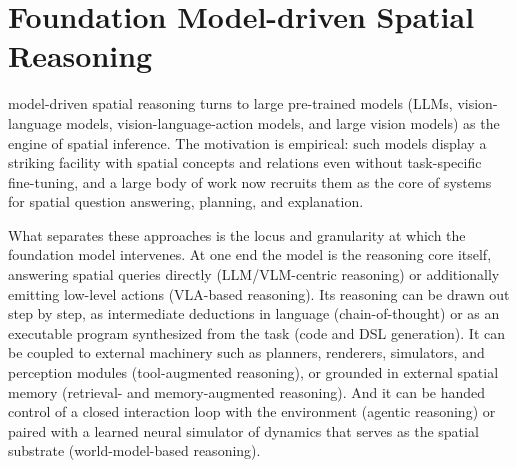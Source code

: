 

\section{Foundation Model-driven Spatial Reasoning}
\label{sec:p3_s7_3}

 model-driven spatial reasoning turns to large pre-trained models (LLMs, vision-language models, vision-language-action models, and large vision models) as the engine of spatial inference. The motivation is empirical: such models display a striking facility with spatial concepts and relations even without task-specific fine-tuning, and a large body of work now recruits them as the core of systems for spatial question answering, planning, and explanation.

What separates these approaches is the locus and granularity at which the foundation model intervenes. At one end the model is the reasoning core itself, answering spatial queries directly (LLM/VLM-centric reasoning) or additionally emitting low-level actions (VLA-based reasoning). Its reasoning can be drawn out step by step, as intermediate deductions in language (chain-of-thought) or as an executable program synthesized from the task (code and DSL generation). It can be coupled to external machinery such as planners, renderers, simulators, and perception modules (tool-augmented reasoning), or grounded in external spatial memory (retrieval- and memory-augmented reasoning). And it can be handed control of a closed interaction loop with the environment (agentic reasoning) or paired with a learned neural simulator of dynamics that serves as the spatial substrate (world-model-based reasoning).

























